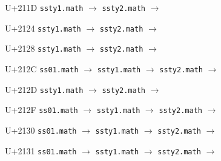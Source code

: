 \documentclass{article}
\begin{document}
\begin{substitutions}
\goodbreak

U+211D  \linebreak
    \texttt{ssty1.math} $\to$  \linebreak
    \texttt{ssty2.math} $\to$  

\goodbreak

U+2124  \linebreak
    \texttt{ssty1.math} $\to$  \linebreak
    \texttt{ssty2.math} $\to$  

\goodbreak

U+2128  \linebreak
    \texttt{ssty1.math} $\to$  \linebreak
    \texttt{ssty2.math} $\to$  

\goodbreak

U+212C  \linebreak
    \texttt{ss01.math} $\to$  \linebreak
    \texttt{ssty1.math} $\to$  \linebreak
    \texttt{ssty2.math} $\to$  

\goodbreak

U+212D  \linebreak
    \texttt{ssty1.math} $\to$  \linebreak
    \texttt{ssty2.math} $\to$  

\goodbreak

U+212F  \linebreak
    \texttt{ss01.math} $\to$  \linebreak
    \texttt{ssty1.math} $\to$  \linebreak
    \texttt{ssty2.math} $\to$  

\goodbreak

U+2130  \linebreak
    \texttt{ss01.math} $\to$  \linebreak
    \texttt{ssty1.math} $\to$  \linebreak
    \texttt{ssty2.math} $\to$  

\goodbreak

U+2131  \linebreak
    \texttt{ss01.math} $\to$  \linebreak
    \texttt{ssty1.math} $\to$  \linebreak
    \texttt{ssty2.math} $\to$  


\end{substitutions}
\end{document}
